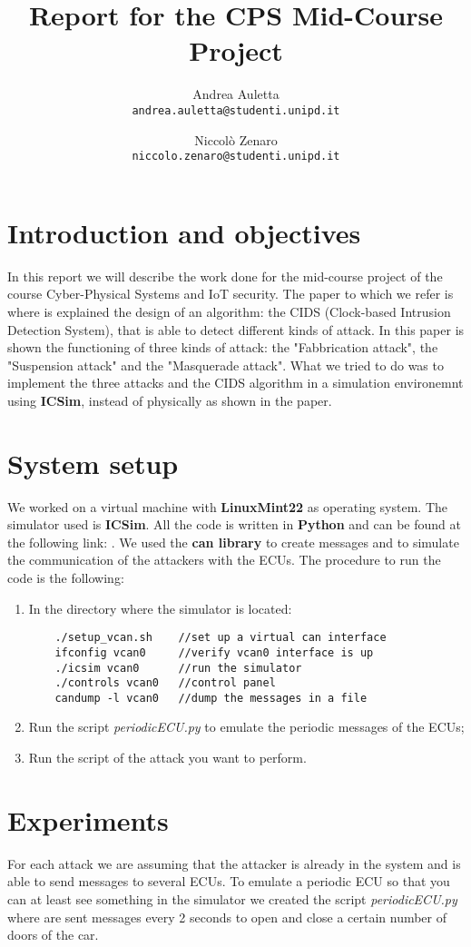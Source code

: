 \documentclass[12pt]{article}
\title{Report for the CPS Mid-Course Project}
\author{
    Andrea Auletta \\ \texttt{andrea.auletta@studenti.unipd.it} \and
    Niccolò Zenaro \\ \texttt{niccolo.zenaro@studenti.unipd.it}
}
\begin{document}
\maketitle
\newpage
\tableofcontents
\newpage

\section{Introduction and objectives}
In this report we will describe the work done for the mid-course project of the course 
Cyber-Physical Systems and IoT security. 
The paper to which we refer is \textbf{\cite{Cho2016} } where is explained 
the design of an algorithm: the CIDS (Clock-based Intrusion Detection System), that is able 
to detect different kinds of attack. In this paper is shown the functioning of three kinds 
of attack: the "Fabbrication attack", the "Suspension attack" and the "Masquerade attack". 
What we tried to do was to implement the three attacks and the CIDS algorithm in a simulation 
environemnt using \textbf{ICSim}, instead of physically as shown in the paper.
\section{System setup}
We worked on a virtual machine with \textbf{LinuxMint22} as operating system.
The simulator used is \textbf{ICSim}. All the code is written in \textbf{Python} and can 
be found at the following link: .%
We used the \textbf{can library} to create messages and to simulate the communication of the attackers with 
the ECUs.
The procedure to run the code is the following:
\begin{enumerate}
    \item In the directory where the simulator is located:
    \begin{verbatim}
    ./setup_vcan.sh    //set up a virtual can interface 
    ifconfig vcan0     //verify vcan0 interface is up
    ./icsim vcan0      //run the simulator
    ./controls vcan0   //control panel
    candump -l vcan0   //dump the messages in a file
    \end{verbatim}
    \item Run the script \textit{periodicECU.py} to emulate the periodic messages of the ECUs;
    \item Run the script of the attack you want to perform.
\end{enumerate}
\section{Experiments}
For each attack we are assuming that the attacker is already in the system and is able to send messages to 
several ECUs. To emulate a periodic ECU so that you can at least see something in the simulator we created 
the script \textit{periodicECU.py} where are sent messages every 2 seconds to open and close a certain number of 
doors of the car.  
\end{document}
